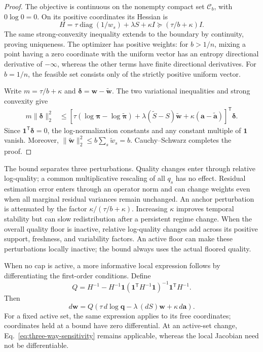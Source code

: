 \documentclass[10pt]{article}
\begin{document}
\begin{proof}
The objective is continuous on the nonempty compact set $\mathcal C_b$, with
$0\log0=0$. On its positive coordinates its Hessian is
\begin{equation}
 H=\tau\operatorname{diag}(1/w_s)+\lambda S+\kappa I
 \succeq(\tau/b+\kappa)I.
\end{equation}
The same strong-convexity inequality extends to the boundary by continuity,
proving uniqueness. The optimizer has positive weights: for $b>1/n$, mixing
a point having a zero coordinate with the uniform vector has an entropy
directional derivative of $-\infty$, whereas the other terms have finite
directional derivatives. For $b=1/n$, the feasible set consists only of the
strictly positive uniform vector.

Write $m=\tau/b+\kappa$ and
$\boldsymbol\delta=\boldsymbol w-\widetilde{\boldsymbol w}$.
The two variational inequalities and strong convexity give
\begin{align}
 m\|\boldsymbol\delta\|_2^2
 &\le
 \left[
  \tau(\log\boldsymbol\pi-\log\widetilde{\boldsymbol\pi})
  +\lambda(\widetilde S-S)\widetilde{\boldsymbol w}
  +\kappa(\boldsymbol a-\widetilde{\boldsymbol a})
 \right]^{\mathsf T}\boldsymbol\delta.
\end{align}
Since $\boldsymbol1^{\mathsf T}\boldsymbol\delta=0$, the log-normalization
constants and any constant multiple of $\boldsymbol1$ vanish. Moreover,
$\|\widetilde{\boldsymbol w}\|_2^2\le b\sum_s\widetilde w_s=b$.
Cauchy--Schwarz completes the proof.
\end{proof}

The bound separates three perturbations. Quality changes enter through
relative log-quality; a common multiplicative rescaling of all $q_s$ has no
effect. Residual estimation error enters through an operator norm and can
change weights even when all marginal residual variances remain unchanged.
An anchor perturbation is attenuated by the factor
$\kappa/(\tau/b+\kappa)$. Increasing $\kappa$ improves temporal stability but
can slow redistribution after a persistent regime change. When the overall
quality floor is inactive, relative log-quality changes add across its positive
support, freshness, and variability factors. An active floor can make these
perturbations locally inactive; the bound always uses the actual floored quality.

When no cap is active, a more informative local expression follows by
differentiating the first-order conditions. Define
\begin{equation}
 Q=H^{-1}-H^{-1}\boldsymbol1
 (\boldsymbol1^{\mathsf T}H^{-1}\boldsymbol1)^{-1}
 \boldsymbol1^{\mathsf T}H^{-1}.
\end{equation}
Then
\begin{equation}
 d\boldsymbol w
 =Q\left(\tau\,d\log\boldsymbol q
         -\lambda\,(dS)\boldsymbol w
         +\kappa\,d\boldsymbol a\right).
 \label{eq:local-sensitivity}
\end{equation}
For a fixed active set, the same expression applies to its free coordinates;
coordinates held at a bound have zero differential. At an active-set change,
Eq.~\eqref{eq:three-way-sensitivity} remains applicable, whereas the local
Jacobian need not be differentiable.
\end{document}
